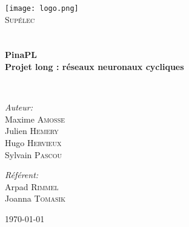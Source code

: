\begin{titlepage}
\begin{center}

\texttt{[image: logo.png]}~\\[1cm]

\textsc{\LARGE Supélec}\\[1.5cm]

\textsc{\Large }\\[0.5cm]

\HRule \\[0.4cm]

{\huge \bfseries PinaPL\\
Projet long : réseaux neuronaux cycliques \\[0.4cm] }

\HRule \\[1.5cm]

\begin{minipage}{0.4\textwidth}
\begin{flushleft} \large
\emph{Auteur:}\\
Maxime \textsc{Amosse}\\
Julien \textsc{Hemery}\\
Hugo \textsc{Hervieux}\\
Sylvain \textsc{Pascou}
\end{flushleft}
\end{minipage}
\begin{minipage}{0.4\textwidth}
\begin{flushright} \large
\emph{Référent:} \\
Arpad \textsc{Rimmel} \\
Joanna \textsc{Tomasik}
\end{flushright}
\end{minipage}

\vfill

{\large \today}

\end{center}
\end{titlepage}